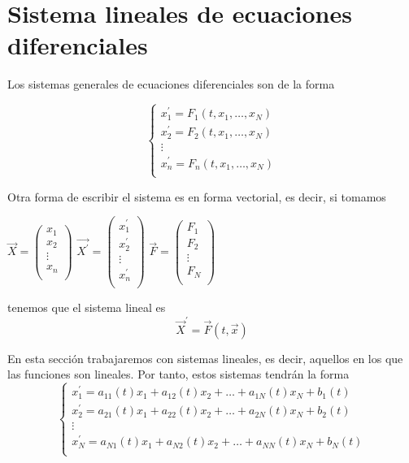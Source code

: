 \section{Sistema lineales de ecuaciones diferenciales}
Los sistemas generales de ecuaciones diferenciales son de la forma

\begin{equation*}
  \left\lbrace
  \begin{array}{l}
     x_1^\prime = F_1(t, x_1, \hdots, x_N)\\
     x_2^\prime = F_2(t, x_1, \hdots, x_N)\\
     \vdots\\
     x_n^\prime = F_n(t, x_1, \hdots, x_N)\\
  \end{array}
  \right.
\end{equation*}

Otra forma de escribir el sistema es en forma vectorial, es decir, si tomamos
\begin{center}
$\vec{X} = \begin{pmatrix}
x_1\\
x_2\\
\vdots\\
x_n\\
\end{pmatrix}$ $\vec{X^\prime} = \begin{pmatrix}
x_1^\prime\\
x_2^\prime\\
\vdots\\
x_n^\prime\\
\end{pmatrix}$ $\vec{F} = \begin{pmatrix}
F_1\\
F_2\\
\vdots\\
F_N\\
\end{pmatrix}$
\end{center}
tenemos que el sistema lineal es $$\vec{X}^\prime = \vec{F}(t, \vec{x})$$

En esta sección trabajaremos con sistemas lineales, es decir, aquellos en los que las funciones son lineales. Por tanto, estos sistemas tendrán la forma
\begin{equation*}
  \left\lbrace
  \begin{array}{l}
     x_1^\prime = a_{11}(t)x_1+a_{12}(t)x_2+\hdots+a_{1N}(t)x_N+b_1(t)\\
     x_2^\prime = a_{21}(t)x_1+a_{22}(t)x_2+\hdots+a_{2N}(t)x_N+b_2(t)\\
     \vdots\\
     x_N^\prime = a_{N1}(t)x_1+a_{N2}(t)x_2+\hdots+a_{NN}(t)x_N+b_N(t)\\
  \end{array}
  \right.
\end{equation*}

